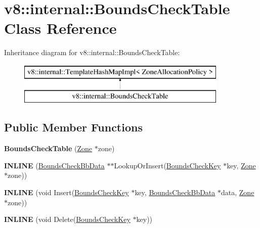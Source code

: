 \hypertarget{classv8_1_1internal_1_1_bounds_check_table}{}\section{v8\+:\+:internal\+:\+:Bounds\+Check\+Table Class Reference}
\label{classv8_1_1internal_1_1_bounds_check_table}
Inheritance diagram for v8\+:\+:internal\+:\+:Bounds\+Check\+Table\+:\begin{figure}[H]
\begin{center}
\leavevmode
\includegraphics[height=2.000000cm]{classv8_1_1internal_1_1_bounds_check_table}
\end{center}
\end{figure}
\subsection*{Public Member Functions}
\begin{DoxyCompactItemize}
\item 
{\bfseries Bounds\+Check\+Table} (\hyperlink{classv8_1_1internal_1_1_zone}{Zone} $\ast$zone)\hypertarget{classv8_1_1internal_1_1_bounds_check_table_a249f9d0429a2642e46ee9839ed1592e8}{}\label{classv8_1_1internal_1_1_bounds_check_table_a249f9d0429a2642e46ee9839ed1592e8}

\item 
{\bfseries I\+N\+L\+I\+NE} (\hyperlink{classv8_1_1internal_1_1_bounds_check_bb_data}{Bounds\+Check\+Bb\+Data} $\ast$$\ast$Lookup\+Or\+Insert(\hyperlink{classv8_1_1internal_1_1_bounds_check_key}{Bounds\+Check\+Key} $\ast$key, \hyperlink{classv8_1_1internal_1_1_zone}{Zone} $\ast$zone))\hypertarget{classv8_1_1internal_1_1_bounds_check_table_a0186a5444b781e695ea4f6bd85db9e2a}{}\label{classv8_1_1internal_1_1_bounds_check_table_a0186a5444b781e695ea4f6bd85db9e2a}

\item 
{\bfseries I\+N\+L\+I\+NE} (void Insert(\hyperlink{classv8_1_1internal_1_1_bounds_check_key}{Bounds\+Check\+Key} $\ast$key, \hyperlink{classv8_1_1internal_1_1_bounds_check_bb_data}{Bounds\+Check\+Bb\+Data} $\ast$data, \hyperlink{classv8_1_1internal_1_1_zone}{Zone} $\ast$zone))\hypertarget{classv8_1_1internal_1_1_bounds_check_table_a83d7e49a7bc1ed829d5601f26e6b584b}{}\label{classv8_1_1internal_1_1_bounds_check_table_a83d7e49a7bc1ed829d5601f26e6b584b}

\item 
{\bfseries I\+N\+L\+I\+NE} (void Delete(\hyperlink{classv8_1_1internal_1_1_bounds_check_key}{Bounds\+Check\+Key} $\ast$key))\hypertarget{classv8_1_1internal_1_1_bounds_check_table_a4730123adb93e99d7501d8d4e9d3953f}{}\label{classv8_1_1internal_1_1_bounds_check_table_a4730123adb93e99d7501d8d4e9d3953f}

\end{DoxyCompactItemize}
